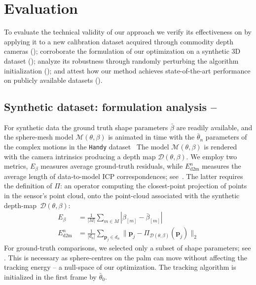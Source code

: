\section{Evaluation}
To evaluate the technical validity of our approach we verify its effectiveness on by applying it to a new calibration dataset acquired through commodity depth cameras (); corroborate the formulation of our optimization on a synthetic 3D dataset (); analyze its robustness through randomly perturbing the algorithm initialization (); and attest how our method achieves state-of-the-art performance on publicly available datasets ().

\subsection{Synthetic dataset: formulation analysis -- }
\label{sec:analysis}
For synthetic data the ground truth shape parameters $\bar\beta$ are readily available, and the sphere-mesh model $\mathcal{M}(\theta,\beta)$ is animated in time with the $\bar\theta_n$ parameters of the complex motions in the \texttt{Handy} dataset~\cite{tkach2016sphere} 
The model $\mathcal{M}(\theta,\beta)$ is rendered with the camera intrinsics producing a depth map $\mathcal{D}(\theta,\beta)$. We employ two metrics, $E_{\beta}$ measures average ground-truth residuals, while $E_\text{d2m}^n$ measures the average length of data-to-model ICP correspondences; see~\cite{tkach2016sphere}. The latter requires the definition of $\Pi$: an operator computing the closest-point projection of points in the sensor's point cloud, onto the point-cloud associated with the synthetic depth-map~$\mathcal{D}(\theta,\beta)$:
% 
\begin{align}
E_{\beta} &= \tfrac{1}{|M|} \sum_{m \in M} \left| \beta_{[m]} - \bar\beta_{[m]} \right|
\label{eq:metricgt}
\\
E_\text{d2m}^n &= \tfrac{1}{|d_n|} \sum_{\mathbf{p}_j \in d_n} \| \mathbf{p}_j - \Pi_{\mathcal{D}(\theta,\beta)}(\mathbf{p}_j) \|_2
\label{eq:metricd2m}
\end{align}
% 
For ground-truth comparisons, we selected only a subset  of shape parameters; see . This is necessary as sphere-centres on the palm can move without affecting the tracking energy -- a null-space of our optimization. The tracking algorithm is initialized in the first frame by $\bar\theta_0$.
